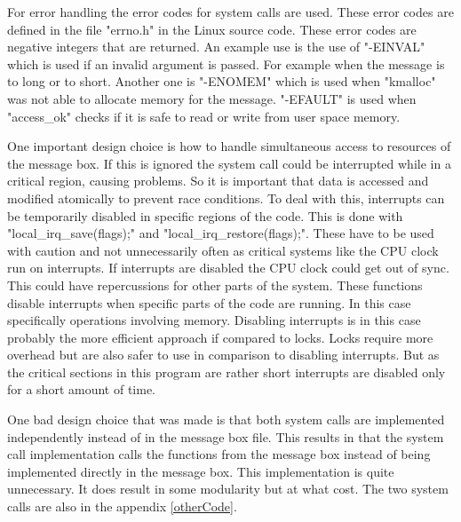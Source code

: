 \documentclass[12pt,a4paper]{report}
\begin{document}
For error handling the error codes for system calls are used. These error codes are defined in the file "errno.h" in the Linux source code. These error codes are negative integers that are returned. An example use is the use of "-EINVAL" which is used if an invalid argument is passed. For example when the message is to long or to short. Another one is "-ENOMEM" which is used when "kmalloc" was not able to allocate memory for the message. "-EFAULT" is used when "access\_ok" checks if it is safe to read or write from user space memory.

One important design choice is how to handle simultaneous access to resources of the message box. If this is ignored the system call could be interrupted while in a critical region, causing problems. So it is important that data is accessed and modified atomically to prevent race conditions. To deal with this, interrupts can be temporarily disabled in specific regions of the code. This is done with "local\_irq\_save(flags);" and "local\_irq\_restore(flags);". These have to be used with caution and not unnecessarily often as critical systems like the CPU clock run on interrupts. If interrupts are disabled the CPU clock could get out of sync. This could have repercussions for other parts of the system. These functions disable interrupts when specific parts of the code are running. In this case specifically operations involving memory. Disabling interrupts is in this case probably the more efficient approach if compared to locks. Locks require more overhead but are also safer to use in comparison to disabling interrupts. But as the critical sections in this program are rather short interrupts are disabled only for a short amount of time.

One bad design choice that was made is that both system calls are implemented independently instead of in the message box file. This results in that the system call implementation calls the functions from the message box instead of being implemented directly in the message box. This implementation is quite unnecessary. It does result in some modularity but at what cost. The two system calls are also in the appendix \ref{otherCode}.
\end{document}
